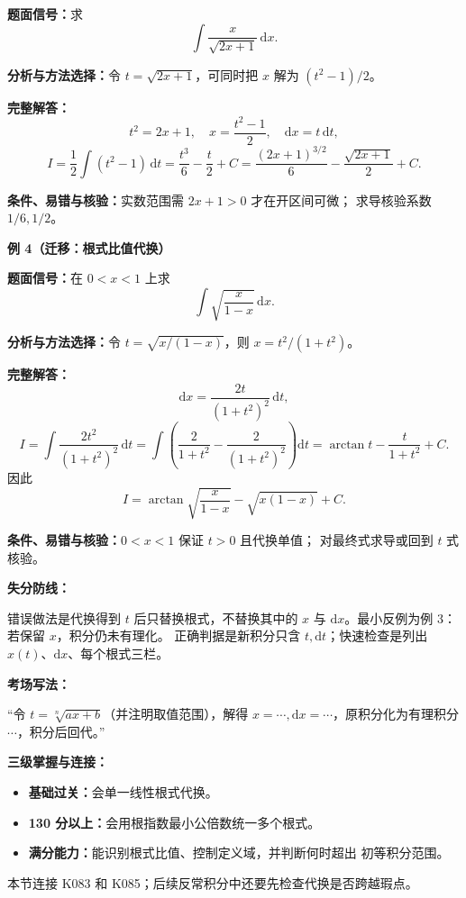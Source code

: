 \begin{knowledgeBox}
\textbf{题面信号：}求
\[
\int\frac{x}{\sqrt{2x+1}}\,\mathrm dx.
\]

\textbf{分析与方法选择：}令 \(t=\sqrt{2x+1}\)，可同时把 \(x\) 解为
\((t^2-1)/2\)。

\textbf{完整解答：}
\[
t^2=2x+1,\quad x=\frac{t^2-1}{2},\quad
\mathrm dx=t\,\mathrm dt,
\]
\[
I=\frac12\int(t^2-1)\,\mathrm dt
=\frac{t^3}{6}-\frac t2+C
=\frac{(2x+1)^{3/2}}6-\frac{\sqrt{2x+1}}2+C.
\]

\textbf{条件、易错与核验：}实数范围需 \(2x+1>0\) 才在开区间可微；
求导核验系数 \(1/6,1/2\)。

\textbf{例 4（迁移：根式比值代换）}

\textbf{题面信号：}在 \(0<x<1\) 上求
\[
\int\sqrt{\frac{x}{1-x}}\,\mathrm dx.
\]

\textbf{分析与方法选择：}令
\(t=\sqrt{x/(1-x)}\)，则
\(x=t^2/(1+t^2)\)。

\textbf{完整解答：}
\[
\mathrm dx=\frac{2t}{(1+t^2)^2}\,\mathrm dt,
\]
\[
I=\int\frac{2t^2}{(1+t^2)^2}\,\mathrm dt
=\int\left(\frac2{1+t^2}-\frac2{(1+t^2)^2}\right)\mathrm dt
=\arctan t-\frac{t}{1+t^2}+C.
\]
因此
\[
I=\arctan\sqrt{\frac{x}{1-x}}-\sqrt{x(1-x)}+C.
\]

\textbf{条件、易错与核验：}\(0<x<1\) 保证 \(t>0\) 且代换单值；
对最终式求导或回到 \(t\) 式核验。

\textbf{失分防线：}

错误做法是代换得到 \(t\) 后只替换根式，不替换其中的 \(x\) 与
\(\mathrm dx\)。最小反例为例 3：若保留 \(x\)，积分仍未有理化。
正确判据是新积分只含 \(t,\mathrm dt\)；快速检查是列出
\(x(t)\)、\(\mathrm dx\)、每个根式三栏。

\textbf{考场写法：}

“令 \(t=\sqrt[n]{ax+b}\)（并注明取值范围），解得
\(x=\cdots,\mathrm dx=\cdots\)，原积分化为有理积分
\(\cdots\)，积分后回代。”

\textbf{三级掌握与连接：}
\begin{itemize}
  \item \textbf{基础过关：}会单一线性根式代换。
  \item \textbf{130 分以上：}会用根指数最小公倍数统一多个根式。
  \item \textbf{满分能力：}能识别根式比值、控制定义域，并判断何时超出
  初等积分范围。
\end{itemize}
本节连接 K083 和 K085；后续反常积分中还要先检查代换是否跨越瑕点。
\end{knowledgeBox}



